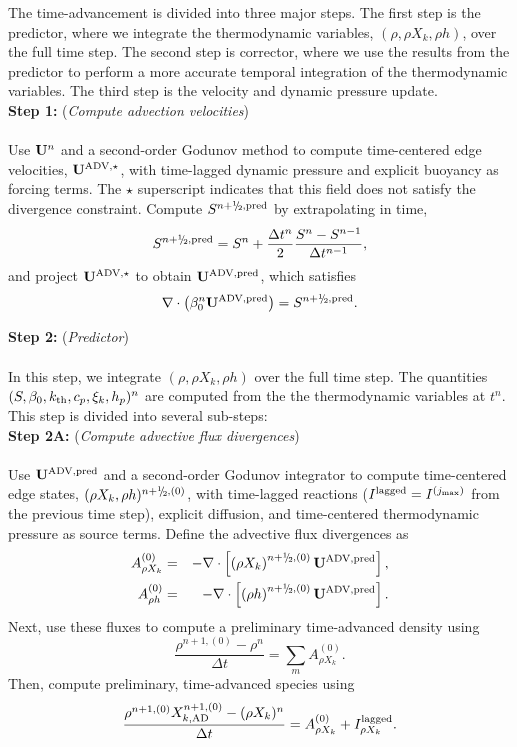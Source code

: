 The time-advancement is divided into three major steps.  The first step is the predictor, where we integrate the thermodynamic variables, $(\rho,\rho X_k,\rho h)$, over the full time step.  The second step is corrector, where we use the results from the predictor to perform a more accurate temporal integration of the thermodynamic variables.  The third step is the velocity and dynamic pressure update.\\

{\bf Step 1:} ({\it Compute advection velocities})\\ \\
Use ${\bf U}^n$ and a second-order Godunov method to compute time-centered edge velocities, $\mathbf{U}^{\mathrm{ADV},\star}$, with time-lagged dynamic pressure and explicit buoyancy as forcing terms.  The $\star$ superscript indicates that this field does not satisfy the divergence constraint.  Compute $S^{n+\myhalf,{\rm pred}}$ by extrapolating in time,
\begin{equation}
S^{n+\myhalf,{\rm pred}} = S^n + \frac{\Delta t^n}{2}\frac{S^n - S^{n-1}}{\Delta t^{n-1}},
\end{equation}
and project $\mathbf{U}^{\mathrm{ADV},\star}$ to obtain $\mathbf{U}^{\mathrm{ADV},\mathrm{pred}}$, which satisfies
\begin{equation}
\nabla\cdot\left(\beta_0^n\uadvsdcpred\right) = S^{n+\myhalf,\rm{pred}}.
\end{equation}

{\bf Step 2:} ({\it Predictor})\\ \\
 In this step, we integrate $(\rho, \rho X_k, \rho h)$ over the full time step.  The quantities $(S, \beta_0, k_{\rm th}, c_p, \xi_k, h_p)^n$ are computed from the the thermodynamic variables at $t^n$.  This step is divided into several sub-steps:\\

{\bf Step 2A:} ({\it Compute advective flux divergences})\\ \\
Use $\mathbf{U}^{\mathrm{ADV},\mathrm{pred}}$ and a second-order Godunov integrator to compute time-centered edge states, $(\rho X_k, \rho h)^{n+\myhalf,(0)}$, with time-lagged reactions ($I^{\rm lagged} = I^{(j_{\rm max})}$ from the previous time step), explicit diffusion, and time-centered thermodynamic pressure as source terms.  Define the advective flux divergences as
\begin{eqnarray}
A_{\rho X_k}^{(0)} &=& -\nabla\cdot\left[\left(\rho X_k\right)^{n+\myhalf,{(0)}}\uadvsdcpred\right],\\
A_{\rho h}^{(0)} &=& -\nabla\cdot\left[\left(\rho h\right)^{n+\myhalf,(0)}\uadvsdcpred\right].
\end{eqnarray}
Next, use these fluxes to compute a preliminary time-advanced density using
\begin{equation}
\frac{\rho^{n+1,(0)} - \rho^n}{\Delta t} = \sum_mA_{\rho X_k}^{(0)}.
\end{equation}
Then, compute preliminary, time-advanced species using
\begin{equation}
\frac{\rho^{n+1,(0)}X_{k,{\rm AD}}^{n+1,(0)} - (\rho X_k)^n}{\Delta t} = A_{\rho X_k}^{(0)} + I_{\rho X_k}^{\rm lagged}.\label{eq:sdc species 2}
\end{equation}

